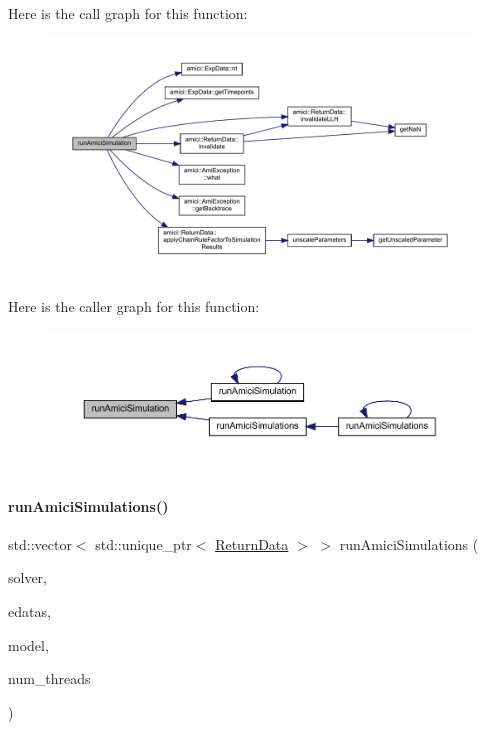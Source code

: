 Here is the call graph for this function\+:
\nopagebreak
\begin{figure}[H]
\begin{center}
\leavevmode
\includegraphics[width=350pt]{namespaceamici_a46331a204e7511587acc2cc0b1ce7ed0_cgraph}
\end{center}
\end{figure}
Here is the caller graph for this function\+:
\nopagebreak
\begin{figure}[H]
\begin{center}
\leavevmode
\includegraphics[width=350pt]{namespaceamici_a46331a204e7511587acc2cc0b1ce7ed0_icgraph}
\end{center}
\end{figure}
\mbox{\label{namespaceamici_a76e08fb9dd88a6b5352ae53d7afedc1e}} 
\paragraph{\texorpdfstring{run\+Amici\+Simulations()}{runAmiciSimulations()}\hspace{0.1cm}{\footnotesize\ttfamily [1/2]}}
{\footnotesize\ttfamily std\+::vector$<$ std\+::unique\+\_\+ptr$<$ \mbox{\hyperlink{classamici_1_1_return_data}{Return\+Data}} $>$ $>$ run\+Amici\+Simulations (\begin{DoxyParamCaption}\item[{\mbox{\hyperlink{classamici_1_1_solver}{Solver}} const \&}]{solver,  }\item[{const std\+::vector$<$ \mbox{\hyperlink{classamici_1_1_exp_data}{Exp\+Data}} $\ast$$>$ \&}]{edatas,  }\item[{\mbox{\hyperlink{classamici_1_1_model}{Model}} const \&}]{model,  }\item[{int}]{num\+\_\+threads }\end{DoxyParamCaption})}

